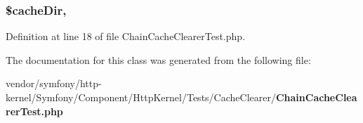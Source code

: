 \subsubsection[{\$cache\+Dir}]{\setlength{\rightskip}{0pt plus 5cm}\$cache\+Dir\hspace{0.3cm}{\ttfamily [static]}, {\ttfamily [protected]}}\label{class_symfony_1_1_component_1_1_http_kernel_1_1_tests_1_1_cache_clearer_1_1_chain_cache_clearer_test_ac9d27ec635bd451cdecc1d20135f0698}


Definition at line 18 of file Chain\+Cache\+Clearer\+Test.\+php.



The documentation for this class was generated from the following file\+:\begin{DoxyCompactItemize}
\item 
vendor/symfony/http-\/kernel/\+Symfony/\+Component/\+Http\+Kernel/\+Tests/\+Cache\+Clearer/{\bf Chain\+Cache\+Clearer\+Test.\+php}\end{DoxyCompactItemize}
